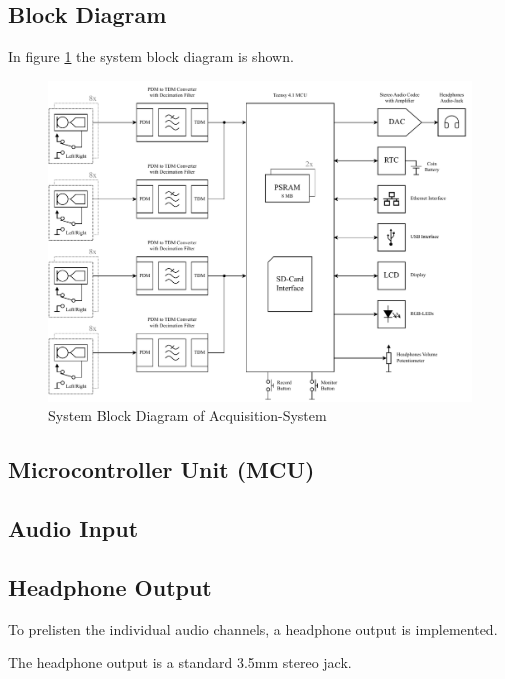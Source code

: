 \subsection{Block Diagram}
In figure \ref{fig:acquisition_system_design_block_diagram} the system block diagram is shown.
\begin{figure}[h]
	\centering
	\includegraphics[width=1.0\textwidth]{images/4_design_acquisition_system/acquisition_system_design_block_diagram.pdf}
	\caption{System Block Diagram of Acquisition-System}
	\label{fig:acquisition_system_design_block_diagram}
\end{figure}






\subsection{Microcontroller Unit (MCU)}



\subsection{Audio Input}

\subsection{Headphone Output}

To prelisten the individual audio channels, a headphone output is implemented.

The headphone output is a standard 3.5mm stereo jack.



